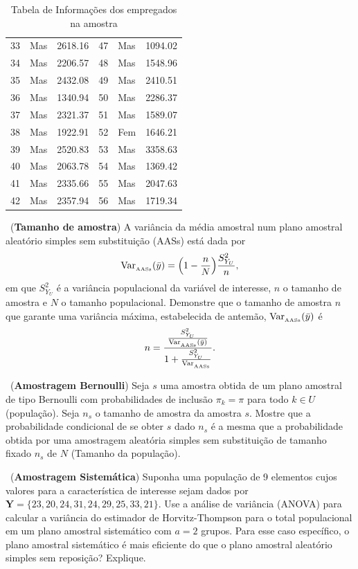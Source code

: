 \documentclass[a4paper,12pt,oneside,twocolumn]{Config/milktest}
\begin{document}
{\begin{table}[H]
\begin{tabular}{rlr|rlr}
   33 & Mas & 2618.16 &   47 & Mas & 1094.02 \\
   34 & Mas & 2206.57 &   48 & Mas & 1548.96 \\
   35 & Mas & 2432.08 &   49 & Mas & 2410.51 \\
   36 & Mas & 1340.94 &   50 & Mas & 2286.37 \\
   37 & Mas & 2321.37 &   51 & Mas & 1589.07 \\
   38 & Mas & 1922.91 &   52 & Fem & 1646.21 \\
   39 & Mas & 2520.83 &   53 & Mas & 3358.63 \\
   40 & Mas & 2063.78 &   54 & Mas & 1369.42 \\
   41 & Mas & 2335.66 &   55 & Mas & 2047.63 \\
   42 & Mas & 2357.94 &   56 & Mas & 1719.34 \\
   \hline
\end{tabular}
\caption{Tabela de Informações dos empregados na amostra} 
\label{ID:Renda}
\end{table}
}


\newpage
\pagestyle{empty}


\vspace{-8cm}

\question~({\bf Tamanho de amostra}) 
A variância da média amostral num plano amostral aleatório simples sem substituição (AASs) está dada por
$$
{\rm Var}_{_{\rm AASs}}(\bar{y}) = \Big( 1-\frac{n}{N}\Big)\frac{S^2_{Y_U}}{n},
$$
em que $S^2_{Y_U}$ é a variância populacional da variável de interesse, $n$ o tamanho de amostra e $N$ o tamanho populacional. Demonstre que o tamanho de amostra $n$ que garante uma variância máxima, estabelecida de antemão, ${\rm Var}_{_{\rm AASs}}(\bar{y})$ é
$$
n = \frac{
            \frac{S^2_{Y_U}}{{\rm Var}_{_{\rm AASs}}(\bar{y})}}{1+\frac{S^2_{Y_U}}{{\rm Var}_{_{\rm AASs}}}}.
$$

\medskip 
\question~({\bf Amostragem Bernoulli}) Seja $s$ uma amostra obtida de um plano amostral de tipo Bernoulli com probabilidades de inclusão $\pi_k = \pi$ para todo $k \in U$ (população). Seja $n_s$ o tamanho de amostra da amostra $s.$ Mostre que a probabilidade condicional de se obter $s$ dado $n_s$ é a mesma que a probabilidade obtida por uma amostragem aleatória simples sem substituição de tamanho fixado $n_s$ de $N$ (Tamanho da população). 



\medskip
\question~({\bf Amostragem Sistemática}) Suponha uma população de 9 elementos cujos valores para a característica de interesse sejam dados por
$\mathbf{Y} = \{23, 20, 24, 31, 24, 29, 25, 33, 21\}.$ Use a análise de variância (ANOVA) para calcular a variância do estimador de Horvitz-Thompson para o total populacional em um plano amostral sistemático com $a = 2$ grupos. Para esse caso específico, o plano amostral sistemático é mais eficiente do que o plano amostral aleatório simples sem reposição? Explique.
\end{document}
